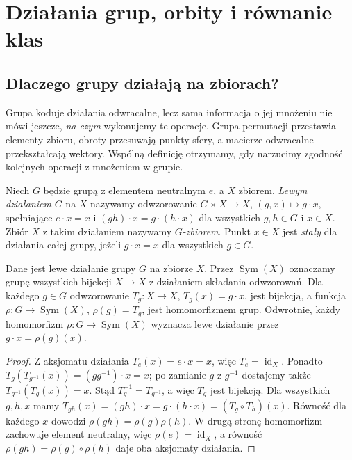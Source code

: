 \chapter{Działania grup, orbity i równanie klas}
\label{aa:ch:dzialania}

\section{Dlaczego grupy działają na zbiorach?}
Grupa koduje działania odwracalne, lecz sama informacja o jej mnożeniu
nie mówi jeszcze, \emph{na czym} wykonujemy te operacje. Grupa
permutacji przestawia elementy zbioru, obroty przesuwają punkty sfery,
a macierze odwracalne przekształcają wektory. Wspólną definicję
otrzymamy, gdy narzucimy zgodność kolejnych operacji z mnożeniem w grupie.

\begin{definicja}
\label{aa:def:dzialanie}
Niech $G$ będzie grupą z elementem neutralnym $e$, a $X$ zbiorem.
\emph{Lewym działaniem} $G$ na $X$ nazywamy odwzorowanie
$G\times X\to X$, $(g,x)\mapsto g\cdot x$, spełniające
$e\cdot x=x$ i $(gh)\cdot x=g\cdot(h\cdot x)$
dla wszystkich $g,h\in G$ i $x\in X$.
Zbiór $X$ z takim działaniem nazywamy \emph{$G$-zbiorem}.
Punkt $x\in X$ jest \emph{stały} dla działania całej grupy,
jeżeli $g\cdot x=x$ dla wszystkich $g\in G$.
\end{definicja}

\begin{lemat}
\label{aa:lem:akcja-hom}
Dane jest lewe działanie grupy $G$ na zbiorze $X$.
Przez $\operatorname{Sym}(X)$ oznaczamy grupę wszystkich bijekcji
$X\to X$ z działaniem składania odwzorowań. Dla każdego
$g\in G$ odwzorowanie $T_g:X\to X$, $T_g(x)=g\cdot x$,
jest bijekcją, a funkcja
$\rho:G\to\operatorname{Sym}(X)$, $\rho(g)=T_g$,
jest homomorfizmem grup.
Odwrotnie, każdy homomorfizm $\rho:G\to\operatorname{Sym}(X)$
wyznacza lewe działanie przez $g\cdot x=\rho(g)(x)$.
\end{lemat}
\begin{proof}
Z aksjomatu działania $T_e(x)=e\cdot x=x$, więc $T_e=\operatorname{id}_X$.
Ponadto $T_g(T_{g^{-1}}(x))=(gg^{-1})\cdot x=x$;
po zamianie $g$ z $g^{-1}$ dostajemy także
$T_{g^{-1}}(T_g(x))=x$. Stąd $T_g^{-1}=T_{g^{-1}}$,
a więc $T_g$ jest bijekcją.
Dla wszystkich $g,h,x$ mamy
$T_{gh}(x)=(gh)\cdot x=g\cdot(h\cdot x)=(T_g\circ T_h)(x)$.
Równość dla każdego $x$ dowodzi $\rho(gh)=\rho(g)\rho(h)$.
W drugą stronę homomorfizm zachowuje element neutralny,
więc $\rho(e)=\operatorname{id}_X$, a równość
$\rho(gh)=\rho(g)\circ\rho(h)$ daje oba aksjomaty działania.
\end{proof}

